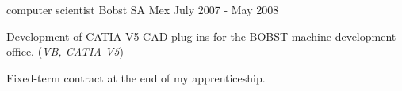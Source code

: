 \begin{cventries}

\cventry
{computer scientist} %
{Bobst SA} %
{Mex} %
{July 2007 - May 2008} %
{ %
\begin{cvitems}
\item {Development of CATIA V5 CAD plug-ins for the BOBST machine development office. (\emph{VB, CATIA V5})}
\item {Fixed-term contract at the end of my apprenticeship.}
\end{cvitems}
}


\end{cventries}
